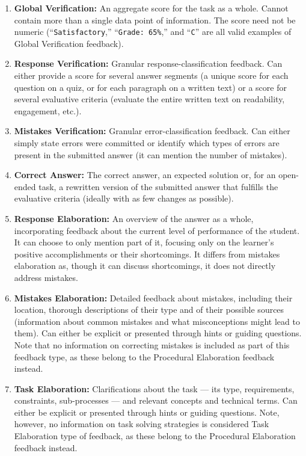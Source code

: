 \begin{enumerate}[label=\textbf{\arabic*.}]
\item \textbf{Global Verification:} An aggregate score for the task as a whole. Cannot contain more than a single data point of information. The score need not be numeric (\eg ``\texttt{Satisfactory},'' ``\texttt{Grade: 65\%},'' and ``\texttt{C}'' are all valid examples of Global Verification feedback).

\item \textbf{Response Verification:} Granular response-classification feedback. Can either provide a score for several answer segments (\eg a unique score for each question on a quiz, or for each paragraph on a written text) or a score for several evaluative criteria (\eg evaluate the entire written text on readability, engagement, etc.). 

\item \textbf{Mistakes Verification:} Granular error-classification feedback. Can either simply state errors were committed or identify which types of errors are present in the submitted answer (it can mention the number of mistakes). 

\item \textbf{Correct Answer:} The correct answer, an expected solution or, for an open-ended task, a rewritten version of the submitted answer that fulfills the evaluative criteria (ideally with as few changes as possible).

\item \textbf{Response Elaboration:} An overview of the answer as a whole, incorporating feedback about the current level of performance of the student. It can choose to only mention part of it, focusing only on the learner's positive accomplishments or their shortcomings. It differs from mistakes elaboration as, though it can discuss shortcomings, it does not directly address mistakes.

\item \textbf{Mistakes Elaboration:} Detailed feedback about mistakes, including their location, thorough descriptions of their type and of their possible sources (\eg information about common mistakes and what misconceptions might lead to them). Can either be explicit or presented through hints or guiding questions. Note that no information on correcting mistakes is included as part of this feedback type, as these belong to the Procedural Elaboration feedback instead.

\item \textbf{Task Elaboration:} Clarifications about the task --- its type, requirements, constraints, sub-processes --- and relevant concepts and technical terms. Can either be explicit or presented through hints or guiding questions. Note, however, no information on task solving strategies is considered Task Elaboration type of feedback, as these belong to the Procedural Elaboration feedback instead.


\end{enumerate}
